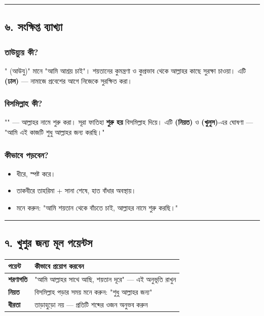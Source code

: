 \medskip\hrule\medskip

\subsection*{৬. সংক্ষিপ্ত ব্যাখ্যা}

\subsubsection*{\textbf{তাউয়্যুয় কী?}}
" (আউযু)" মানে "আমি আশ্রয় চাই"। শয়তানের কুমন্ত্রণা ও কুপ্রভাব থেকে আল্লাহর কাছে সুরক্ষা চাওয়া। এটি \textbf{ (ঢাল)} — নামাজে প্রবেশের আগে নিজেকে সুরক্ষিত করা।

\subsubsection*{\textbf{বিসমিল্লাহ কী?}}
"" — আল্লাহর নামে শুরু করা। সূরা ফাতিহা \textbf{শুরু হয়} বিসমিল্লাহ দিয়ে। এটি \textbf{ (নিয়ত)} ও \textbf{ (খুলুস)}-এর ঘোষণা — "আমি এই কাজটি শুধু আল্লাহর জন্য করছি।"

\subsubsection*{\textbf{কীভাবে পড়বেন?}}
\begin{itemize}
\item ধীরে, স্পষ্ট করে।
\item তাকবীরে তাহরিমা + সানা শেষে, হাত বাঁধার অবস্থায়।
\item মনে করুন: "আমি শয়তান থেকে বাঁচতে চাই, আল্লাহর নামে শুরু করছি।"
\end{itemize}
\medskip\hrule\medskip

\subsection*{৭. খুশুর জন্য মূল পয়েন্টস}

\begin{table}[h]\centering\small
\begin{tabular}{ll}
পয়েন্ট & কীভাবে প্রয়োগ করবেন \\
\hline
\textbf{শরণাগতি} & "আমি আল্লাহর সাথে আছি, শয়তান দূরে" — এই অনুভূতি রাখুন \\
\textbf{নিয়ত} & বিসমিল্লাহ পড়ার সময় মনে করুন: "শুধু আল্লাহর জন্য" \\
\textbf{ধীরতা} & তাড়াহুড়ো নয় — প্রতিটি শব্দের ওজন অনুভব করুন \\
\hline
\end{tabular}
\end{table}

